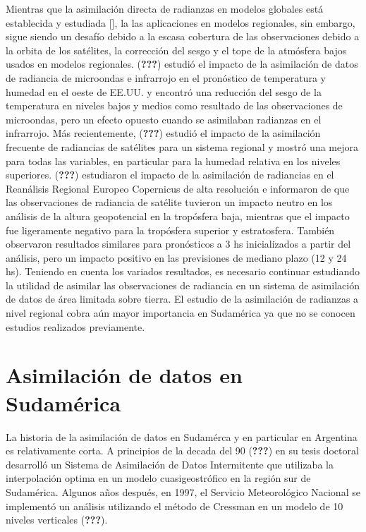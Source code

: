 \documentclass[12pt,twoside]{reedthesis}
\begin{document}
Mientras que la asimilación directa de radianzas en modelos globales está establecida y estudiada {[}{]}, la las aplicaciones en modelos regionales, sin embargo, sigue siendo un desafío debido a la escasa cobertura de las observaciones debido a la orbita de los satélites, la corrección del sesgo y el tope de la atmósfera bajos usados en modelos regionales. ({\textbf{???}}) estudió el impacto de la asimilación de datos de radiancia de microondas e infrarrojo en el pronóstico de temperatura y humedad en el oeste de EE.UU. y encontró una reducción del sesgo de la temperatura en niveles bajos y medios como resultado de las observaciones de microondas, pero un efecto opuesto cuando se asimilaban radianzas en el infrarrojo. Más recientemente, ({\textbf{???}}) estudió el impacto de la asimilación frecuente de radiancias de satélites para un sistema regional y mostró una mejora para todas las variables, en particular para la humedad relativa en los niveles superiores. ({\textbf{???}}) estudiaron el impacto de la asimilación de radiancias en el Reanálisis Regional Europeo Copernicus de alta resolución e informaron de que las observaciones de radiancia de satélite tuvieron un impacto neutro en los análisis de la altura geopotencial en la tropósfera baja, mientras que el impacto fue ligeramente negativo para la tropósfera superior y estratosfera. También observaron resultados similares para pronósticos a 3 hs inicializados a partir del análisis, pero un impacto positivo en las previsiones de mediano plazo (12 y 24 hs). Teniendo en cuenta los variados resultados, es necesario continuar estudiando la utilidad de asimilar las observaciones de radiancia en un sistema de asimilación de datos de área limitada sobre tierra. El estudio de la asimilación de radianzas a nivel regional cobra aún mayor importancia en Sudamérica ya que no se conocen estudios realizados previamente.

\hypertarget{asimilaciuxf3n-de-datos-en-sudamuxe9rica}{%
\section{Asimilación de datos en Sudamérica}\label{asimilaciuxf3n-de-datos-en-sudamuxe9rica}}

La historia de la asimilación de datos en Sudamérca y en particular en Argentina es relativamente corta. A principios de la decada del 90 ({\textbf{???}}) en su tesis doctoral desarrolló un Sistema de Asimilación de Datos Intermitente que utilizaba la interpolación optima en un modelo cuasigeostrófico en la región sur de Sudamérica. Algunos años después, en 1997, el Servicio Meteorológico Nacional se implementó un
análisis utilizando el método de Cressman en un modelo de 10 niveles verticales ({\textbf{???}}).
\end{document}
